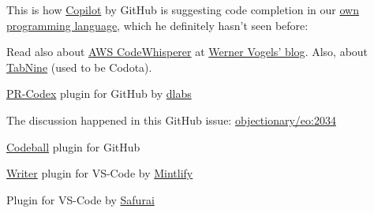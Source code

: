 \documentclass{article}
\begin{document}

This is how \href{https://github.com/features/copilot}{Copilot} by GitHub is suggesting code completion in our \href{https://www.eolang.org}{own programming language}, which he definitely hasn't seen before:

\begin{multicols}{4}
\end{multicols}

Read also about \href{https://aws.amazon.com/codewhisperer/}{AWS CodeWhisperer} at \href{https://www.allthingsdistributed.com/2023/04/how-ai-coding-companions-will-change-the-way-developers-work.html}{Werner Vogels' blog}. Also, about \href{https://github.com/codota}{TabNine} (used to be Codota).

\plush{}



\href{https://github.com/decentralizedlabs/pr-codex}{PR-Codex} plugin for GitHub by \href{https://www.dlabs.app/}{dlabs}

\plush{}



The discussion happened in this GitHub issue: \href{https://github.com/objectionary/eo/pull/2034}{objectionary/eo:2034}

\plush{}



\href{https://codeball.ai/}{Codeball} plugin for GitHub

\plush{}



\href{https://github.com/mintlify/writer}{Writer} plugin for VS-Code by \href{https://writer.mintlify.com/}{Mintlify}

\plush{}



Plugin for VS-Code by \href{https://www.safurai.com/}{Safurai}
\end{document}
